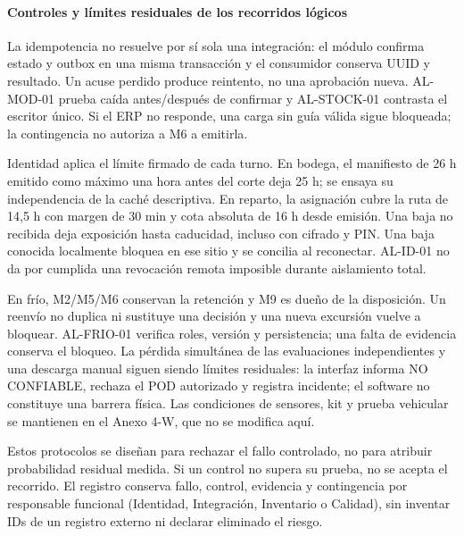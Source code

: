 \paragraph{Controles y límites residuales de los recorridos lógicos}
La idempotencia no resuelve por sí sola una integración: el módulo confirma estado y outbox en una misma transacción y el consumidor conserva UUID y resultado. Un acuse perdido produce reintento, no una aprobación nueva. AL-MOD-01 prueba caída antes/después de confirmar y AL-STOCK-01 contrasta el escritor único. Si el ERP no responde, una carga sin guía válida sigue bloqueada; la contingencia no autoriza a M6 a emitirla.

Identidad aplica el límite firmado de cada turno. En bodega, el manifiesto de 26 h emitido como máximo una hora antes del corte deja 25 h; se ensaya su independencia de la caché descriptiva. En reparto, la asignación cubre la ruta de 14,5 h con margen de 30 min y cota absoluta de 16 h desde emisión. Una baja no recibida deja exposición hasta caducidad, incluso con cifrado y PIN. Una baja conocida localmente bloquea en ese sitio y se concilia al reconectar. AL-ID-01 no da por cumplida una revocación remota imposible durante aislamiento total.

En frío, M2/M5/M6 conservan la retención y M9 es dueño de la disposición. Un reenvío no duplica ni sustituye una decisión y una nueva excursión vuelve a bloquear. AL-FRIO-01 verifica roles, versión y persistencia; una falta de evidencia conserva el bloqueo. La pérdida simultánea de las evaluaciones independientes y una descarga manual siguen siendo límites residuales: la interfaz informa NO CONFIABLE, rechaza el POD autorizado y registra incidente; el software no constituye una barrera física. Las condiciones de sensores, kit y prueba vehicular se mantienen en el Anexo 4-W, que no se modifica aquí.

Estos protocolos se diseñan para rechazar el fallo controlado, no para atribuir probabilidad residual medida. Si un control no supera su prueba, no se acepta el recorrido. El registro conserva fallo, control, evidencia y contingencia por responsable funcional (Identidad, Integración, Inventario o Calidad), sin inventar IDs de un registro externo ni declarar eliminado el riesgo.

\label{fuente-13-puntos-unicos-de-falla-y-riesgos-residuales-fin}
